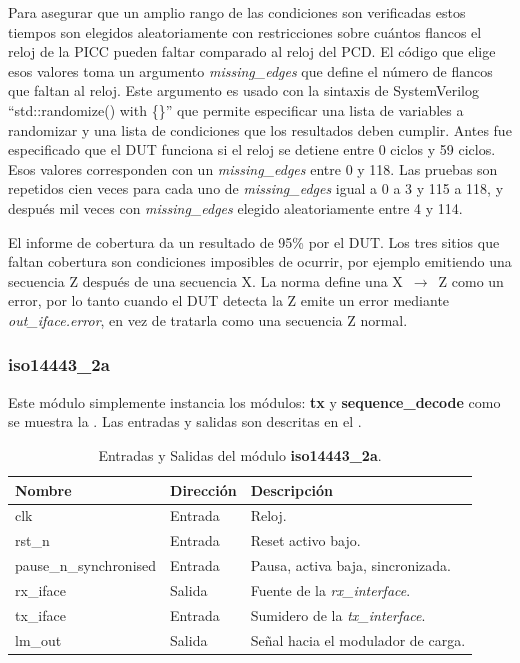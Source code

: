 \documentclass[a4paper, twoside, 11pt]{report}
\begin{document}
Para asegurar que un amplio rango de las condiciones son verificadas estos tiempos son elegidos aleatoriamente con restricciones sobre cuántos flancos el reloj de la PICC pueden faltar comparado al reloj del PCD. El código que elige esos valores toma un argumento \textit{missing\_edges} que define el número de flancos que faltan al reloj. Este argumento es usado con la sintaxis de SystemVerilog “std::randomize() with \{\}” que permite especificar una lista de variables a randomizar y una lista de condiciones que los resultados deben cumplir. Antes fue especificado que el DUT funciona si el reloj se detiene entre 0 ciclos y 59 ciclos. Esos valores corresponden con un \textit{missing\_edges} entre 0 y 118. Las pruebas son repetidos cien veces para cada uno de \textit{missing\_edges} igual a  0 a 3 y 115 a 118, y después mil veces con \textit{missing\_edges} elegido aleatoriamente entre 4 y 114.

El informe de cobertura da un resultado de 95\% por el DUT. Los tres sitios que faltan cobertura son condiciones imposibles de ocurrir, por ejemplo emitiendo una secuencia Z después de una secuencia X. La norma define una X~$\rightarrow$~Z como un error, por lo tanto cuando el DUT detecta la Z emite un error mediante \textit{out\_iface.error}, en vez de tratarla como una secuencia Z normal.

\FloatBarrier
\subsubsection{iso14443\_2a}

Este módulo simplemente instancia los módulos: \textbf{tx} y \textbf{sequence\_decode} como se muestra la . Las entradas y salidas son descritas en el .

\begin{table}[htb]
  \centering
  \tablezebra
  \begin{tabulary}{\linewidth}{l|l|L}
    \textbf{Nombre}&\textbf{Dirección}&\textbf{Descripción} \\
    \hline
    clk&Entrada&Reloj. \\
    rst\_n&Entrada&Reset activo bajo. \\
    pause\_n\_synchronised &Entrada&Pausa, activa baja, sincronizada. \\
    rx\_iface&Salida&Fuente de la \textit{rx\_interface}. \\
    tx\_iface&Entrada&Sumidero de la \textit{tx\_interface}. \\
    lm\_out&Salida&Señal hacia el modulador de carga. \\
  \end{tabulary}
  \caption{Entradas y Salidas del módulo \textbf{iso14443\_2a}.}
  \label{tab:ports_iso14443_2a}
\end{table}
\end{document}
